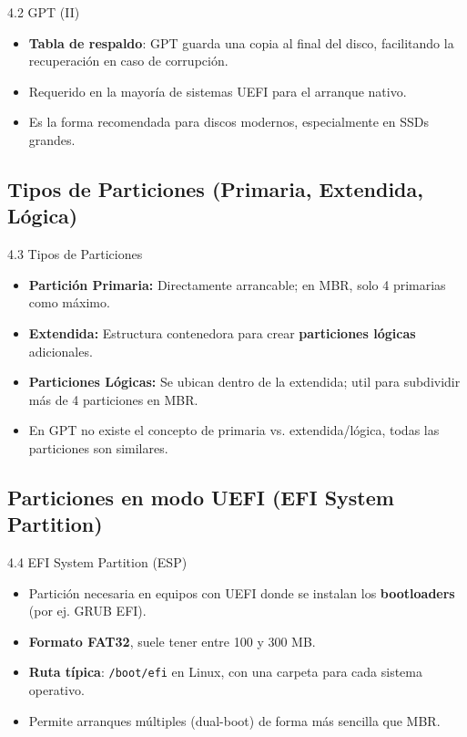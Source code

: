 \documentclass{beamer}
\begin{document}
\begin{frame}{4.2 GPT (II)}
	\begin{itemize}
		\item \textbf{Tabla de respaldo}: GPT guarda una copia al final del disco, facilitando la recuperación en caso de corrupción.
		\item Requerido en la mayoría de sistemas UEFI para el arranque nativo.
		\item Es la forma recomendada para discos modernos, especialmente en SSDs grandes.
	\end{itemize}
\end{frame}

\subsection{Tipos de Particiones (Primaria, Extendida, Lógica)}
\begin{frame}{4.3 Tipos de Particiones}
	\begin{itemize}
		\item \textbf{Partición Primaria:} Directamente arrancable; en MBR, solo 4 primarias como máximo.
		\item \textbf{Extendida:} Estructura contenedora para crear \textbf{particiones lógicas} adicionales.
		\item \textbf{Particiones Lógicas:} Se ubican dentro de la extendida; util para subdividir más de 4 particiones en MBR.
		\item En GPT no existe el concepto de primaria vs. extendida/lógica, todas las particiones son similares.
	\end{itemize}
\end{frame}

\subsection{Particiones en modo UEFI (EFI System Partition)}
\begin{frame}{4.4 EFI System Partition (ESP)}
	\begin{itemize}
		\item Partición necesaria en equipos con UEFI donde se instalan los \textbf{bootloaders} (por ej. GRUB EFI).
		\item \textbf{Formato FAT32}, suele tener entre 100 y 300 MB.
		\item \textbf{Ruta típica}: \texttt{/boot/efi} en Linux, con una carpeta para cada sistema operativo.
		\item Permite arranques múltiples (dual-boot) de forma más sencilla que MBR.
	\end{itemize}
\end{frame}
\end{document}
